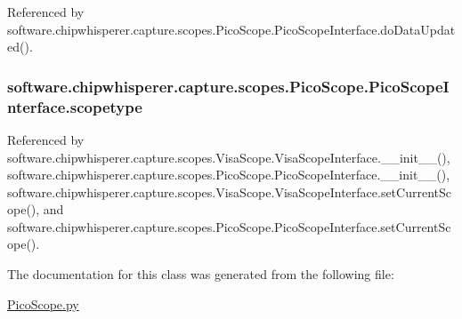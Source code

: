 Referenced by software.\+chipwhisperer.\+capture.\+scopes.\+Pico\+Scope.\+Pico\+Scope\+Interface.\+do\+Data\+Updated().

\hypertarget{classsoftware_1_1chipwhisperer_1_1capture_1_1scopes_1_1PicoScope_1_1PicoScopeInterface_ae87a5f8e59f87a8a19609b2dba4266ee}{}
\subsubsection[{scopetype}]{\setlength{\rightskip}{0pt plus 5cm}software.\+chipwhisperer.\+capture.\+scopes.\+Pico\+Scope.\+Pico\+Scope\+Interface.\+scopetype}\label{classsoftware_1_1chipwhisperer_1_1capture_1_1scopes_1_1PicoScope_1_1PicoScopeInterface_ae87a5f8e59f87a8a19609b2dba4266ee}


Referenced by software.\+chipwhisperer.\+capture.\+scopes.\+Visa\+Scope.\+Visa\+Scope\+Interface.\+\_\+\+\_\+init\+\_\+\+\_\+(), software.\+chipwhisperer.\+capture.\+scopes.\+Pico\+Scope.\+Pico\+Scope\+Interface.\+\_\+\+\_\+init\+\_\+\+\_\+(), software.\+chipwhisperer.\+capture.\+scopes.\+Visa\+Scope.\+Visa\+Scope\+Interface.\+set\+Current\+Scope(), and software.\+chipwhisperer.\+capture.\+scopes.\+Pico\+Scope.\+Pico\+Scope\+Interface.\+set\+Current\+Scope().



The documentation for this class was generated from the following file\+:\begin{DoxyCompactItemize}
\item 
\hyperlink{PicoScope_8py}{Pico\+Scope.\+py}\end{DoxyCompactItemize}
